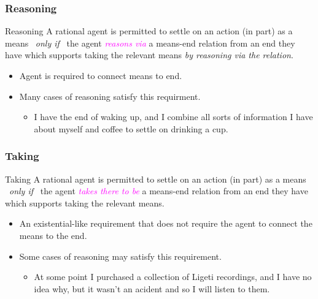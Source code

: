 \documentclass[noamssymb,
]{beamer} %
\begin{document}
\begin{frame}
  \frametitle{Reasoning}

  \begin{block}{Reasoning}
    A rational agent is permitted to settle on an action (in part) as a means
    \newline
    \mbox{ }\hfill\emph{only if}\hfill\mbox{ }
    \newline
    the agent \textcolor{fuchsia}{\emph{reasons via}} a means-end relation from an end they have which supports taking the relevant means \emph{by reasoning via the relation}.
  \end{block}

  \begin{itemize}
  \item Agent is required to connect means to end.
  \item Many cases of reasoning satisfy this requirment.
    \begin{itemize}
    \item I have the end of waking up, and I combine all sorts of information I have about myself and coffee to settle on drinking a cup.
    \end{itemize}
  \end{itemize}
\end{frame}

  \begin{frame}
    \frametitle{Taking}

  \begin{block}{Taking}
    A rational agent is permitted to settle on an action (in part) as a means
    \newline
    \mbox{ }\hfill\emph{only if}\hfill\mbox{ }
    \newline
    the agent \textcolor{fuchsia}{\emph{takes there to be}} a means-end relation from an end they have which supports taking the relevant means.
  \end{block}

  \begin{itemize}
  \item An existential-like requirement that does not require the agent to connect the means to the end.
  \item Some cases of reasoning may satisfy this requirement.
    \begin{itemize}
    \item At some point I purchased a collection of Ligeti recordings, and I have no idea why, but it wasn't an acident and so I will listen to them.
    \end{itemize}
  \end{itemize}
\end{frame}
\end{document}
